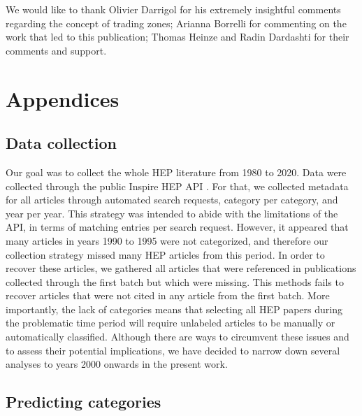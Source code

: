 \documentclass[smallextended]{svjour3}
\begin{document}
\begin{acknowledgements}
We would like to thank Olivier Darrigol for his extremely insightful comments regarding the concept of trading zones; Arianna Borrelli for commenting on the work that led to this publication; Thomas Heinze and  Radin Dardashti for their comments and support.
\end{acknowledgements}




\appendix


\section{Appendices}
\label{section:appendix}


\subsection{Data collection}
\label{appendix:collection}

Our goal was to collect the whole HEP literature from 1980 to 2020. Data were collected through the public Inspire HEP API \citep{InspireAPI}. For that, we collected metadata for all articles through automated search requests, category per category, and year per year. This strategy was intended to abide with the limitations of the API, in terms of matching entries per search request. However, it appeared that many articles in years 1990 to 1995 were not categorized, and therefore our collection strategy missed many HEP articles from this period. In order to recover these articles, we gathered all articles that were referenced in publications collected through the first batch but which were missing. This methods fails to recover articles that were not cited in any article from the first batch. More importantly, 
the lack of categories means that selecting all HEP papers during the problematic time period will require unlabeled articles to be manually or automatically classified. Although there are ways to circumvent these issues and to assess their potential implications, we have decided to narrow down several analyses to years 2000 onwards in the present work.

\subsection{Predicting categories}

\setlength\extrarowheight{2pt}
\end{document}
